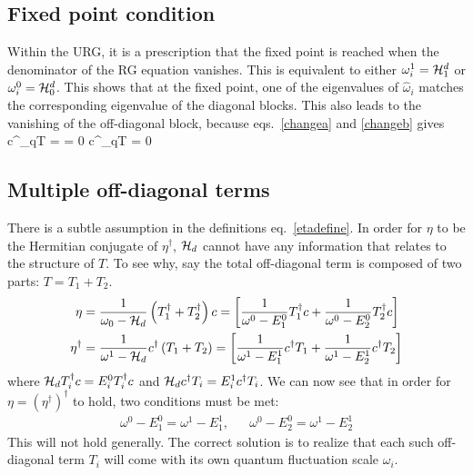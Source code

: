 \documentclass[12pt,twoside]{article}
\numberwithin{equation}{section}
\begin{document}
\subsection{Fixed point condition}\label{match}
Within the URG, it is a prescription that the fixed point is reached when the denominator of the RG equation vanishes. This is equivalent to either \(\omega_i^1 = \mathcal{H}^d_1 \) or \(\omega_i^0 = \mathcal{H}^d_0 \).
This shows that at the fixed point, one of the eigenvalues of \(\hat \omega_i\) matches the corresponding eigenvalue of the diagonal blocks. This also leads to the vanishing of the off-diagonal block, because eqs.~\ref{changea} and \ref{changeb} gives
\beq
c^\dagger_{q\beta}T =  = 0 \implies c^\dagger_{q\beta}T = 0
\eeq
\subsection{Multiple off-diagonal terms}
There is a subtle assumption in the definitions eq.~\ref{etadefine}. In order for \(\eta\) to be the Hermitian conjugate of \(\eta^\dagger\), \(\mathcal{H}_d\) cannot have any information that relates to the structure of \(T\). To see why, say the total off-diagonal term is composed of two parts: \(T = T_1 + T_2\).
\begin{equation}\begin{aligned}
	\eta &= \frac{1}{\omega_0 - \mathcal{H}_d}\left(T_1^\dagger + T_2^\dagger\right)c = \left[\frac{1}{\omega^0 - E^0_1} T_1^\dagger c+ \frac{1}{\omega^0 - E^0_2}T_2^\dagger c\right]\\
	\eta^\dagger &= \frac{1}{\omega^1 - \mathcal{H}_d}c^\dagger\left(T_1 + T_2\right) = \left[\frac{1}{\omega^1 - E^1_1}c^\dagger T_1 + \frac{1}{\omega^1 - E^1_2} c^\dagger T_2\right]\\
\end{aligned}\end{equation}
where \(\mathcal{H}_d T_i^\dagger c = E^0_i T_i^\dagger c\) and \(\mathcal{H}_d  c^\dagger T_i = E^1_i  c^\dagger T_i\). We can now see that in order for \(\eta = \left(\eta^\dagger\right)^\dagger\) to hold, two conditions must be met:
\begin{equation}\begin{aligned}
	\omega^0 - E_1^0 = \omega^1 - E_1^1, && \omega^0 - E_2^0 = \omega^1 - E_2^1
\end{aligned}\end{equation}
This will not hold generally. The correct solution is to realize that each such off-diagonal term \(T_i\) will come with its own quantum fluctuation scale \(\omega_i\).
\end{document}
